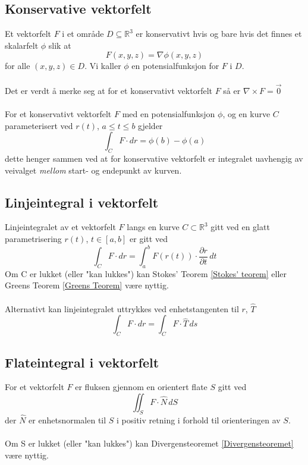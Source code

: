 \documentclass{article}
\begin{document}
\subsection{Konservative vektorfelt}
Et vektorfelt $F$ i et område $D \subseteq \mathbb{R}^3$ er konservativt hvis og bare hvis det finnes et skalarfelt $\phi$ slik at
\[F(x,y,z) = \nabla \phi(x, y, z)\]
for alle $(x, y, z) \in D$. Vi kaller $\phi$ en potensialfunksjon for $F$ i $D$.\\\\
Det er verdt å merke seg at for et konservativt vektorfelt $F$ så er $\nabla \times F = \overrightarrow{0}$\\\\
For et konservativt vektorfelt $F$ med en potensialfunksjon $\phi$, og en kurve $C$ parameterisert ved $r(t)$, $a \leq t \leq b$ gjelder
\[\int_C F \cdot dr = \phi(b) - \phi(a)\]
dette henger sammen ved at for konservative vektorfelt er integralet uavhengig av veivalget \textit{mellom} start- og endepunkt av kurven.

\subsection{Linjeintegral i vektorfelt}
Linjeintegralet av et vektorfelt $F$ langs en kurve $C \subset \mathbb{R}^3$ gitt ved en glatt parametrisering $r(t)$, $t \in [a, b]$ er gitt ved
\[\int_C F \cdot dr = \int_a^b F(r(t)) \cdot \frac{\partial r}{\partial t}\,dt\]
Om C er lukket (eller "kan lukkes") kan Stokes' Teorem \ref{Stokes' teorem} eller Greens Teorem \ref{Greens Teorem} være nyttig.\\\\
Alternativt kan linjeintegralet uttrykkes ved enhetstangenten til $r$, $\hat{T}$
\[\int_C F \cdot dr = \int_C F \cdot \hat{T}\,ds\]
\subsection{Flateintegral i vektorfelt}
For et vektorfelt $F$ er fluksen gjennom en orientert flate $S$ gitt ved
\[\iint_S F \cdot \hat{N}\,dS\]
der $\hat{N}$ er enhetsnormalen til $S$ i positiv retning i forhold til orienteringen av $S$.\\\\
Om S er lukket (eller "kan lukkes") kan Divergensteoremet \ref{Divergensteoremet} være nyttig.


\clearpage
\end{document}
